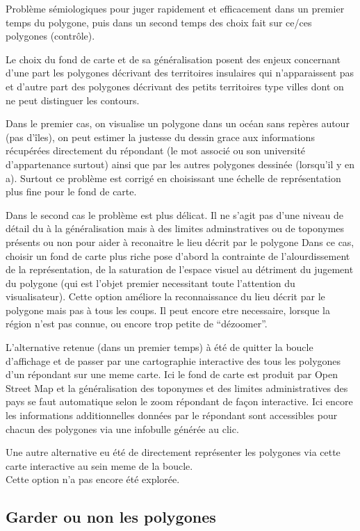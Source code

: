 \documentclass[
  12pt,
  a4paper,
]{scrbook}
\begin{document}
Problème sémiologiques pour juger rapidement et efficacement dans un
premier temps du polygone, puis dans un second temps des choix fait sur
ce/ces polygones (contrôle).

Le choix du fond de carte et de sa généralisation posent des enjeux
concernant d'une part les polygones décrivant des territoires insulaires
qui n'apparaissent pas et d'autre part des polygones décrivant des
petits territoires type villes dont on ne peut distinguer les contours.

Dans le premier cas, on visualise un polygone dans un océan sans repères
autour (pas d'îles), on peut estimer la justesse du dessin grace aux
informations récupérées directement du répondant (le mot associé ou son
université d'appartenance surtout) ainsi que par les autres polygones
dessinée (lorsqu'il y en a). Surtout ce problème est corrigé en
choisissant une échelle de représentation plus fine pour le fond de
carte.

Dans le second cas le problème est plus délicat. Il ne s'agit pas d'une
niveau de détail du à la généralisation mais à des limites
adminstratives ou de toponymes présents ou non pour aider à reconaitre
le lieu décrit par le polygone Dans ce cas, choisir un fond de carte
plus riche pose d'abord la contrainte de l'alourdissement de la
représentation, de la saturation de l'espace visuel au détriment du
jugement du polygone (qui est l'objet premier necessitant toute
l'attention du visualisateur). Cette option améliore la reconnaissance
du lieu décrit par le polygone mais pas à tous les coups. Il peut encore
etre necessaire, lorsque la région n'est pas connue, ou encore trop
petite de ``dézoomer''.

L'alternative retenue (dans un premier temps) à été de quitter la boucle
d'affichage et de passer par une cartographie interactive des tous les
polygones d'un répondant sur une meme carte. Ici le fond de carte est
produit par Open Street Map et la généralisation des toponymes et des
limites administratives des pays se faut automatique selon le zoom
répondant de façon interactive. Ici encore les informations
additionnelles données par le répondant sont accessibles pour chacun des
polygones via une infobulle générée au clic.

Une autre alternative eu été de directement représenter les polygones
via cette carte interactive au sein meme de la boucle.\\
Cette option n'a pas encore été explorée.

\hypertarget{garder-ou-non-les-polygones}{%
\subsection{Garder ou non les
polygones}\label{garder-ou-non-les-polygones}}
\end{document}

